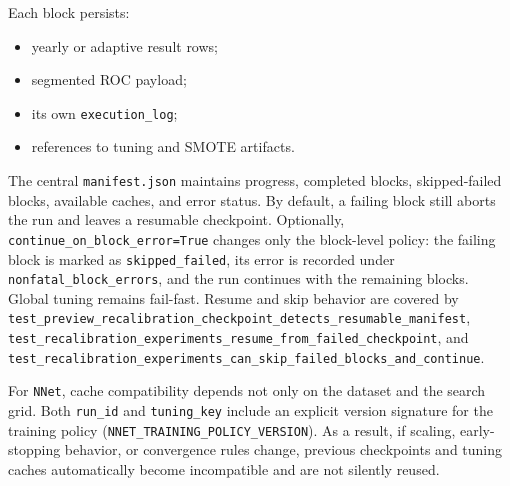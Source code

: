 Each block persists:
\begin{itemize}[leftmargin=*]
  \item yearly or adaptive result rows;
  \item segmented ROC payload;
  \item its own \texttt{execution\_log};
  \item references to tuning and SMOTE artifacts.
\end{itemize}
The central \texttt{manifest.json} maintains progress, completed blocks, skipped-failed blocks, available caches, and error status. By default, a failing block still aborts the run and leaves a resumable checkpoint. Optionally, \texttt{continue\_on\_block\_error=True} changes only the block-level policy: the failing block is marked as \texttt{skipped\_failed}, its error is recorded under \texttt{nonfatal\_block\_errors}, and the run continues with the remaining blocks. Global tuning remains fail-fast. Resume and skip behavior are covered by \texttt{test\_preview\_recalibration\_checkpoint\_detects\_resumable\_manifest}, \texttt{test\_recalibration\_experiments\_resume\_from\_failed\_checkpoint}, and \texttt{test\_recalibration\_experiments\_can\_skip\_failed\_blocks\_and\_continue}.

For \texttt{NNet}, cache compatibility depends not only on the dataset and the search grid. Both \texttt{run\_id} and \texttt{tuning\_key} include an explicit version signature for the training policy (\texttt{NNET\_TRAINING\_POLICY\_VERSION}). As a result, if scaling, early-stopping behavior, or convergence rules change, previous checkpoints and tuning caches automatically become incompatible and are not silently reused.

